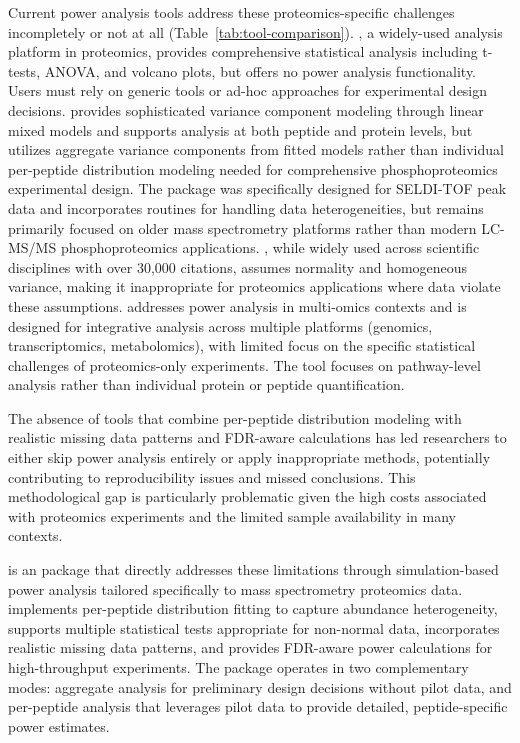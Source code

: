 \documentclass[article]{jss}
\begin{document}
Current power analysis tools address these proteomics-specific challenges incompletely or not at all (Table~\ref{tab:tool-comparison}).  \citep{tyanova2016perseus}, a widely-used analysis platform in proteomics, provides comprehensive statistical analysis including t-tests, ANOVA, and volcano plots, but offers no power analysis functionality. Users must rely on generic tools or ad-hoc approaches for experimental design decisions.  \citep{chang2012msstats} provides sophisticated variance component modeling through linear mixed models and supports analysis at both peptide and protein levels, but utilizes aggregate variance components from fitted models rather than individual per-peptide distribution modeling needed for comprehensive phosphoproteomics experimental design. The  package \citep{nyangoma2012clippda} was specifically designed for SELDI-TOF peak data and incorporates routines for handling data heterogeneities, but remains primarily focused on older mass spectrometry platforms rather than modern LC-MS/MS phosphoproteomics applications.  \citep{gpower}, while widely used across scientific disciplines with over 30,000 citations, assumes normality and homogeneous variance, making it inappropriate for proteomics applications where data violate these assumptions.  \citep{tarazona2020multipower} addresses power analysis in multi-omics contexts and is designed for integrative analysis across multiple platforms (genomics, transcriptomics, metabolomics), with limited focus on the specific statistical challenges of proteomics-only experiments. The tool focuses on pathway-level analysis rather than individual protein or peptide quantification.

The absence of tools that combine per-peptide distribution modeling with realistic missing data patterns and FDR-aware calculations has led researchers to either skip power analysis entirely or apply inappropriate methods, potentially contributing to reproducibility issues and missed conclusions. This methodological gap is particularly problematic given the high costs associated with proteomics experiments and the limited sample availability in many contexts.

 is an  package that directly addresses these limitations through simulation-based power analysis tailored specifically to mass spectrometry proteomics data.  implements per-peptide distribution fitting to capture abundance heterogeneity, supports multiple statistical tests appropriate for non-normal data, incorporates realistic missing data patterns, and provides FDR-aware power calculations for high-throughput experiments. The package operates in two complementary modes: aggregate analysis for preliminary design decisions without pilot data, and per-peptide analysis that leverages pilot data to provide detailed, peptide-specific power estimates.
\end{document}
